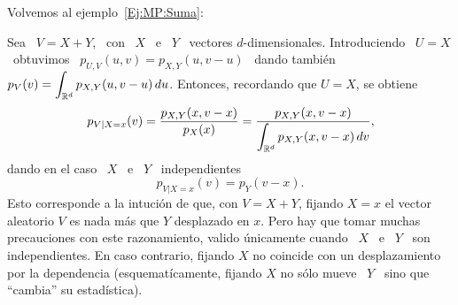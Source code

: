 Volvemos  al ejemplo~\ref{Ej:MP:Suma}:
%
\begin{ejemplo}
\label{Ej:MP:SumaCond}
%
  Sea   \   $V  =   X   +   Y$,  \   con   \   $X$  \   e   \   $Y$  \   vectores
  $d$-dimensionales.  Introduciendo \  $U =  X$  \ obtuvimos  \ $p_{U,V}(u,v)  =
  p_{X,Y}(u,v-u)$  \ dando  tambi\'en \  $\displaystyle p_V(v)  = \int_{\mathbb{R}^d}
  p_{X,Y}(u,v-u) \, du$. Entonces, recordando que $U = X$, se obtiene
  \[
  p_{V|X=x}(v)            =            \frac{p_{X,Y}(x,v-x)}{p_X(x)}           =
  \frac{p_{X,Y}(x,v-x)}{\displaystyle \int_{\mathbb{R}^d} p_{X,Y}(x,v-x) \, dv},
  \]
  dando en el caso \ $X$ \ e \ $Y$ \ independientes
  \[
  p_{V|X=x}(v) = p_Y(v-x).
  \]
  Esto corresponde a la  intuci\'on de que, con $V = X + Y$,  fijando $X = x$ el
  vector aleatorio  $V$ es nada  m\'as que $Y$  desplazado en $x$. Pero  hay que
  tomar muchas precauciones con  este razonamiento, valido \'unicamente cuando \
  $X$  \ e  \  $Y$ \  son independientes.   En  caso contrario,  fijando $X$  no
  coincide con un desplazamiento por la dependencia (esquemat\'icamente, fijando
  $X$ no s\'olo mueve \ $Y$ \ sino que ``cambia'' su estad\'istica).
\end{ejemplo}
